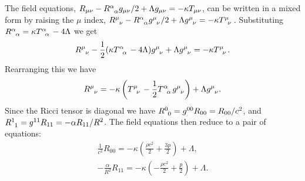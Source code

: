 \documentclass[fleqn]{NotesClass}
\begin{document}
    The field equations, \(R_{\mu\nu} - \tensor{R}{^\alpha_\alpha}g_{\mu\nu}/2 + \Lambda g_{\mu\nu} = -\kappa T_{\mu\nu}\), can be written in a mixed form by raising the \(\mu\) index, \(\tensor{R}{^\mu_\nu} - \tensor{R}{^\alpha_\alpha}\tensor{g}{^\mu_\nu}/2 + \Lambda\tensor{g}{^\mu_\nu} = -\kappa\tensor{T}{^\mu_\nu}\).
    Substituting \(\tensor{R}{^\alpha_\alpha} = \kappa \tensor{T}{^\alpha_\alpha} - 4\Lambda\) we get
    \begin{equation}
        \tensor{R}{^\mu_\nu} - \frac{1}{2}(\kappa \tensor{T}{^\alpha_\alpha} - 4\Lambda)\tensor{g}{^\mu_\nu} + \Lambda\tensor{g}{^\mu_\nu} = -\kappa\tensor{T}{^\mu_\nu}.
    \end{equation}
    Rearranging this we have
    \begin{equation}
        \tensor{R}{^\mu_\nu} = -\kappa\left( \tensor{T}{^\mu_\nu} - \frac{1}{2}\tensor{T}{^\alpha_\alpha}\tensor{g}{^\mu_\nu} \right) + \Lambda\tensor{g}{^\mu_\nu}.
    \end{equation}
    Since the Ricci tensor is diagonal we have \(\tensor{R}{^0_0} = g^{00}R_{00} = R_{00}/c^2\), and \(\tensor{R}{^1_1} = g^{11}R_{11} = -\alpha R_{11}/R^2\).
    The field equations then reduce to a pair of equations:
    \begin{align}
        \frac{1}{c^2}R_{00} = -\kappa\left( \frac{\rho c^2}{2} + \frac{3p}{2} \right) + \Lambda,\\
        -\frac{\alpha}{R^2}R_{11} = -\kappa\left( -\frac{\rho c^2}{2} + \frac{p}{2} \right) + \Lambda.
    \end{align}
    
\end{document}
